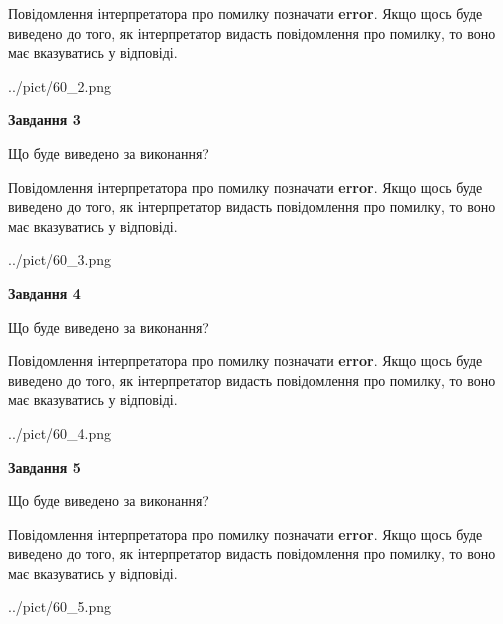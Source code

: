 \documentclass[12pt, ukrainian]{article}
\begin{document}
{\begin {large}
Повідомлення інтерпретатора про помилку позначати \textbf{error}.
Якщо щось буде виведено до того, як інтерпретатор видасть повідомлення про помилку, 
то воно має вказуватись у відповіді. \par


\begin{center}
	{../pict/60_2.png}
\end{center}
\newpage

{\begin {center}\textbf{Завдання 3}\end {center}}\par
Що буде виведено за виконання?

Повідомлення інтерпретатора про помилку позначати \textbf{error}.
Якщо щось буде виведено до того, як інтерпретатор видасть повідомлення про помилку, 
то воно має вказуватись у відповіді. \par


\begin{center}
	{../pict/60_3.png}
\end{center}
\newpage

{\begin {center}\textbf{Завдання 4}\end {center}}\par
Що буде виведено за виконання?

Повідомлення інтерпретатора про помилку позначати \textbf{error}.
Якщо щось буде виведено до того, як інтерпретатор видасть повідомлення про помилку, 
то воно має вказуватись у відповіді. \par


\begin{center}
	{../pict/60_4.png}
\end{center}
\newpage

{\begin {center}\textbf{Завдання 5}\end {center}}\par
Що буде виведено за виконання?

Повідомлення інтерпретатора про помилку позначати \textbf{error}.
Якщо щось буде виведено до того, як інтерпретатор видасть повідомлення про помилку, 
то воно має вказуватись у відповіді. \par


\begin{center}
	{../pict/60_5.png}
\end{center}
\newpage


\end{large}}
\end{document}
